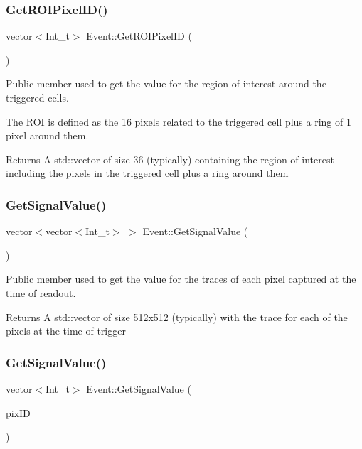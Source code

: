 \subsubsection{\texorpdfstring{Get\+R\+O\+I\+Pixel\+I\+D()}{GetROIPixelID()}}
{\footnotesize\ttfamily vector$<$Int\+\_\+t$>$ Event\+::\+Get\+R\+O\+I\+Pixel\+ID (\begin{DoxyParamCaption}{ }\end{DoxyParamCaption})}



Public member used to get the value for the region of interest around the triggered cells. 

The R\+OI is defined as the 16 pixels related to the triggered cell plus a ring of 1 pixel around them. \begin{DoxyReturn}{Returns}
A std\+::vector of size 36 (typically) containing the region of interest including the pixels in the triggered cell plus a ring around them 
\end{DoxyReturn}
\mbox{\label{classEvent_a8e4f3e73f998f0b414de116d7f586b14}} 
\subsubsection{\texorpdfstring{Get\+Signal\+Value()}{GetSignalValue()}\hspace{0.1cm}{\footnotesize\ttfamily [1/2]}}
{\footnotesize\ttfamily vector$<$vector$<$Int\+\_\+t$>$ $>$ Event\+::\+Get\+Signal\+Value (\begin{DoxyParamCaption}{ }\end{DoxyParamCaption})}



Public member used to get the value for the traces of each pixel captured at the time of readout. 

\begin{DoxyReturn}{Returns}
A std\+::vector of size 512x512 (typically) with the trace for each of the pixels at the time of trigger 
\end{DoxyReturn}
\mbox{\label{classEvent_af98017ed419946ec1981ea489dcf10b2}} 
\subsubsection{\texorpdfstring{Get\+Signal\+Value()}{GetSignalValue()}\hspace{0.1cm}{\footnotesize\ttfamily [2/2]}}
{\footnotesize\ttfamily vector$<$Int\+\_\+t$>$ Event\+::\+Get\+Signal\+Value (\begin{DoxyParamCaption}\item[{int}]{pix\+ID }\end{DoxyParamCaption})}



